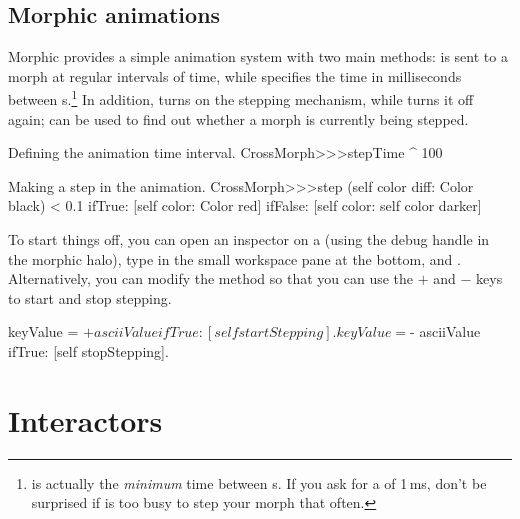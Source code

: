 \documentclass[a4paper,10pt,twoside]{book}
\begin{document}
\subsection{Morphic animations}

Morphic provides a simple animation system with two main methods:  is sent to a morph at regular intervals of time, while  specifies the time in milliseconds between s.\footnote{ is actually the \emph{minimum} time between s.   If you ask for a  of 1\,ms, don't be surprised if \pharo is too busy to step your morph that often.}
In addition, 
 turns on the stepping mechanism, while  turns it off again;   can be used to find out whether a morph is currently being stepped.

\begin{method}{Defining the animation time interval.}
CrossMorph>>>stepTime
	^ 100
\end{method}
\begin{method}{Making a step in the animation.}
CrossMorph>>>step
	(self color diff: Color black) < 0.1
		ifTrue: [self color: Color red]
		ifFalse: [self color: self color darker]
\end{method}
\noindent
To start things off, you can open an inspector on a  (using the debug handle \debugHandle{} in the morphic halo), type  in the small workspace pane at the bottom, and  .
Alternatively, you can modify the  method so that you can use the $+$ and $-$ keys to start and stop stepping. 


\begin{code}{}
	keyValue = $+ asciiValue 
		ifTrue: [self startStepping].
	keyValue = $- asciiValue
		ifTrue: [self stopStepping].
\end{code}


\section{Interactors}
\end{document}
